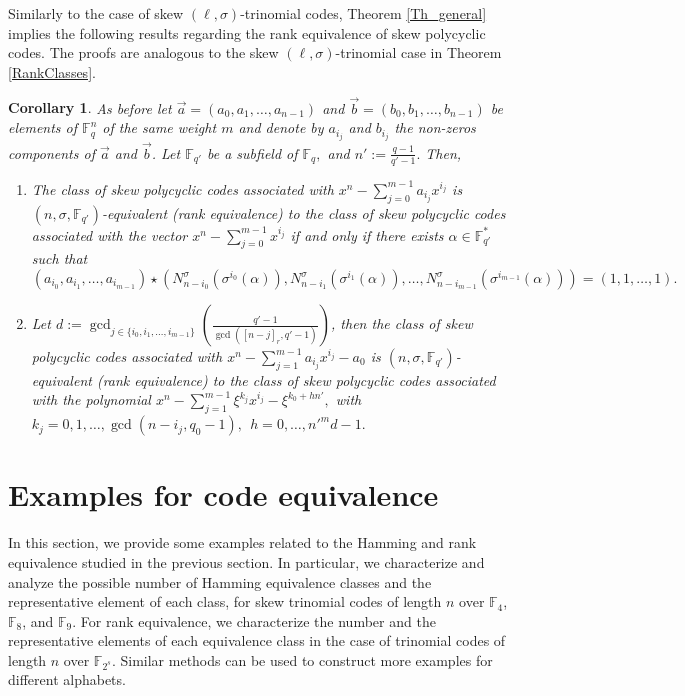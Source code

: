 \documentclass[12pt,paper]{article}
\theoremstyle{plain}
\newtheorem{corollary}[theorem]{Corollary}
\def\dsum #1#2{\displaystyle{\sum_{#1}^{#2}}}
\newcommand{\Fq}{\mathbb{F}_{q}}
\begin{document}
Similarly to  the case of skew $(\ell,\sigma)$-trinomial codes, Theorem \ref{Th_general} implies the following results regarding the rank equivalence of skew polycyclic codes. The proofs are analogous to the skew $(\ell,\sigma)$-trinomial case in Theorem \ref{RankClasses}.

\begin{corollary}
As before let $ \vec{a}=(a_0,a_1,\ldots, a_{n-1})$ and $ \vec{b}=(b_0,b_1,\ldots, b_{n-1})$ be elements of $\mathbb{F}_q^{n}$  
of the same weight $m$  and denote by $ a_{i_j}$ and $  b_{i_j}$  the non-zeros components of $\vec{a}$ and $\vec{b}$. Let $ \mathbb{F}_{q'}$ be a subfield of $\Fq, $ and $n':=\frac{q-1}{q'-1} .$  Then,
\begin{enumerate}
    \item    The class of skew polycyclic  codes associated with   $ x^n-\dsum{j=0}{m-1} a_{i_j} x^{i_j} $ is $(n,\sigma,\mathbb{F}_{q'})$-equivalent (rank equivalence) to the class of  skew polycyclic  codes associated with the vector  $x^n-\dsum{j=0}{m-1}  x^{i_j}$  if and only if there exists $\alpha \in \mathbb{F}_{q'}^*$ such that
    $$ ( a_{i_0}, a_{i_1},\ldots, a_{i_{m-1}})\star( N_{n-i_0}^{\sigma}(\sigma^{i_0}(\alpha)), N_{n-i_1}^{\sigma}(\sigma^{i_1}(\alpha)),\ldots, N_{n-i_{m-1}}^{\sigma}(\sigma^{i_{m-1}}(\alpha)) ) = (1, 1,\ldots, 1 ).$$  
        
     \item  Let   $ d:= \gcd_{ j\in \{i_0,i_1,\ldots, i_{m-1} \} }\left(\frac{q'-1}{ \gcd([n-j]_r,q'-1)}\right)$, then the  class of  skew polycyclic  codes associated with  $ x^n-\dsum{j=1}{m-1} a_{i_j} x^{i_j}-a_0 $ is  $(n,\sigma,\mathbb{F}_{q'})$-equivalent (rank equivalence) to the class of  skew polycyclic  codes associated with the polynomial  $ x^n-\dsum{j=1}{m-1} \xi^{k_j} x^{i_j}- \xi^{k_0+h n'} ,$ with $k_j=0,1,\ldots, \gcd(n-i_j,q_0-1) , \ \ h=0,\ldots, n'^m d-1.$ 
\end{enumerate}
\end{corollary} 











\section{Examples for code equivalence}

In this section, we provide some examples related to the Hamming and rank equivalence studied in the previous section. In particular, we characterize and analyze the possible number of Hamming equivalence classes and the representative element of each class, for skew  trinomial  codes of length $n$  over $\mathbb{F}_4$, $\mathbb{F}_8$, and $\mathbb{F}_9$. For rank equivalence, we characterize the number and the representative elements of each equivalence class in the case of trinomial codes of length $n$ over $\mathbb{F}_{2^s}$. Similar methods can be used to construct more examples for different alphabets.
 
\end{document}
